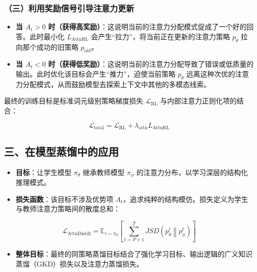 \hypertarget{ux4e09ux5229ux7528ux5956ux52b1ux4fe1ux53f7ux5f15ux5bfcux6ce8ux610fux529bux66f4ux65b0}{%
\subsubsection{（三）利用奖励信号引导注意力更新}\label{ux4e09ux5229ux7528ux5956ux52b1ux4fe1ux53f7ux5f15ux5bfcux6ce8ux610fux529bux66f4ux65b0}}

\begin{itemize}
\tightlist
\item
  \textbf{当 \(A_t>0\) 时（获得高奖励）}：这说明当前的注意力分配模式促成了一个好的回答。此时最小化 \(L_{\mathrm{AttnRL}}\) 会产生``拉力''，将当前正在更新的注意力策略 \(p_\theta\) 拉向那个成功的旧策略 \(p_{\mathrm{old}}\)。
\item
  \textbf{当 \(A_t<0\) 时（获得低奖励）}：这说明当前的注意力分配导致了错误或低质量的输出。此时优化该目标会产生``推力''，迫使当前策略 \(p_\theta\) 远离这种次优的注意力分配模式，从而鼓励模型去探索上下文中其他的多模态线索。
\end{itemize}

最终的训练目标是标准词元级别策略梯度损失 \(\mathcal{L}_{\mathrm{RL}}\) 与内部注意力正则化项的结合：

\[
\mathcal{L}_{\mathrm{total}}=\mathcal{L}_{\mathrm{RL}}+\lambda_{\mathrm{attn}}L_{\mathrm{AttnRL}}
\]

\hypertarget{ux4e09ux5728ux6a21ux578bux84b8ux998fux4e2dux7684ux5e94ux7528}{%
\subsection{三、在模型蒸馏中的应用}\label{ux4e09ux5728ux6a21ux578bux84b8ux998fux4e2dux7684ux5e94ux7528}}

\begin{itemize}
\tightlist
\item
  \textbf{目标}：让学生模型 \(\pi_\theta\) 继承教师模型 \(\pi_\phi\) 的注意力分布，以学习深层的结构化推理模式。
\item
  \textbf{损失函数}：该目标不涉及优势项 \(A_t\)，追求纯粹的结构模仿。损失定义为学生与教师注意力策略间的散度总和：
\end{itemize}

\[
\mathcal{L}_{\mathrm{AttnDistill}}=
\mathbb{E}_{\tau\sim\pi_\theta}
\left[
\sum_{t=P+1}^{T}
JSD\left(p_\theta^t \middle\| p_\phi^t\right)
\right]
\]

\begin{itemize}
\tightlist
\item
  \textbf{整体目标}：最终的同策略蒸馏目标结合了强化学习目标、输出逻辑的广义知识蒸馏（GKD）损失以及注意力蒸馏损失。
\end{itemize}

